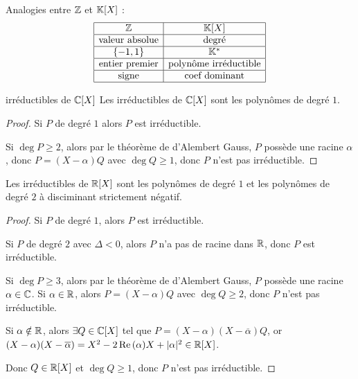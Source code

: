\begin{remarque}
    Analogies entre $\mathbb{Z}$ et $\mathbb{K}[X]$ :
    $$\begin{array}{|c|c|}
        \hline
        \mathbb{Z} & \mathbb{K}[X] \\
        \hline
        \text{valeur absolue} & \text{degré} \\
        \hline 
        \{-1, 1\} & \mathbb{K}^* \\
        \hline
        \text{entier premier} & \text{polynôme irréductible} \\
        \hline
        \text{signe} & \text{coef dominant} \\
        \hline
    \end{array}$$
\end{remarque}

\begin{theoreme}{irréductibles de $\mathbb{C}[X]$}{}
    Les irréductibles de $\mathbb{C}[X]$ sont les polynômes de degré $1$.
\end{theoreme}

\begin{proof}
    Si $P$ de degré $1$ alors $P$ est irréductible.

    Si $\deg P \geqslant 2$, alors par le théorème de d'Alembert Gauss, 
    $P$ possède une racine $\alpha$, donc $P = (X - \alpha) Q$ avec $\deg Q \geqslant 1$, donc
    $P$ n'est pas irréductible.
\end{proof}

\begin{theoreme}{}{}
    Les irréductibles de $\mathbb{R}[X]$ sont les polynômes de degré $1$ et les polynômes
    de degré $2$ à disciminant strictement négatif.
\end{theoreme}

\begin{proof}
    Si $P$ de degré $1$, alors $P$ est irréductible.

    \avspace Si $P$ de degré $2$ avec $\Delta < 0$, alors $P$ n'a pas de racine dans $\mathbb{R}$, donc 
    $P$ est irréductible.

    \avspace Si $\deg P \geqslant 3$, alors par le théorème de d'Alembert Gauss, 
    $P$ possède une racine $\alpha \in \mathbb{C}$. Si $\alpha \in \mathbb{R}$, alors $P = (X - \alpha) Q$ avec $\deg Q \geqslant 2$, donc
    $P$ n'est pas irréductible.

    Si $\alpha \notin \mathbb{R}$, alors $\exists Q \in \mathbb{C}[X]$ tel que $P = (X - \alpha)(X - \overline \alpha) Q$, 
    or $(X - \alpha)(X - \overline \alpha) = X^2 - 2 \operatorname{Re} \,(\alpha) X + |\alpha|^2 \in \mathbb{R}[X]$.

    Donc $Q \in \mathbb{R}[X]$ et $\deg Q \geqslant 1$, donc $P$ n'est pas irréductible.
\end{proof}

